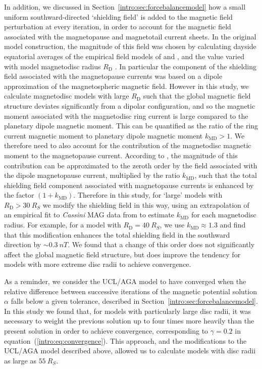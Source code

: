 In addition, we discussed in Section~\ref{intro:sec:forcebalancemodel} how a small uniform southward-directed `shielding field' is added to the magnetic field perturbation at every iteration, in order to account for the magnetic field associated with the magnetopause and magnetotail current sheets. In the original model construction, the magnitude of this field was chosen by calculating dayside equatorial averages of the empirical field models of \citet{alexeev2005} and \citet{alexeev2006}, and the value varied with model magnetodisc radius $R_\mathrm{D}$ \citep[see][Figure 6]{achilleos2010a}. In particular the component of the shielding field associated with the magnetopause currents was based on a dipole approximation of the magnetospheric magnetic field. However in this study, we calculate magnetodisc models with large $R_\mathrm{D}$ such that the global magnetic field structure deviates significantly from a dipolar configuration, and so the magnetic moment associated with the magnetodisc ring current is large compared to the planetary dipole magnetic moment. This can be quantified as the ratio of the ring current magnetic moment to planetary dipole magnetic moment $k_\mathrm{MD} > 1$. We therefore need to also account for the contribution of the magnetodisc magnetic moment to the magnetopause current. According to \citet{alexeev2005}, the magnitude of this contribution can be approximated to the zeroth order by the field associated with the dipole magnetopause current, multiplied by the ratio $k_\mathrm{MD}$, such that the total shielding field component associated with magnetopause currents is enhanced by the factor $(1+k_\mathrm{MD})$. Therefore in this study, for `large' models with $R_\mathrm{D} > \SI{30}{R_S}$ we modify the shielding field in this way, using an extrapolation of an empirical fit to \textit{Cassini} MAG data from \citet{bunce2007} to estimate $k_\mathrm{MD}$ for each magnetodisc radius. For example, for a model with $R_\mathrm{D} = \SI{40}{R_S}$, we use $k_\mathrm{MD} \approx 1.3$ and find that this modification enhances the total shielding field in the southward direction by ${\sim}\SI{0.3}{nT}$. We found that a change of this order does not significantly affect the global magnetic field structure, but does improve the tendency for models with more extreme disc radii to achieve convergence.

As a reminder, we consider the UCL/AGA model to have converged when the relative difference between successive iterations of the magnetic potential solution $\alpha$ falls below a given tolerance, described in Section~\ref{intro:sec:forcebalancemodel}. In this study we found that, for models with particularly large disc radii, it was necessary to weight the previous solution up to four times more heavily than the present solution in order to achieve convergence, corresponding to $\gamma=0.2$ in equation~(\ref{intro:eq:convergence}). This approach, and the modifications to the UCL/AGA model described above, allowed us to calculate models with disc radii as large as $\SI{55}{R_S}$.

